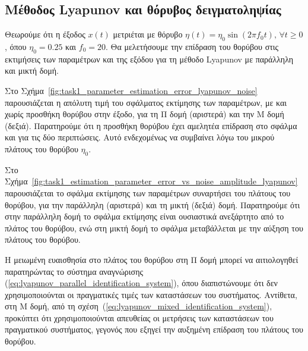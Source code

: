 \documentclass[a4paper,12pt]{article}
\begin{document}
\subsection*{Μέθοδος Lyapunov και θόρυβος δειγματοληψίας}

Θεωρούμε ότι η έξοδος $x(t)$ μετριέται με θόρυβο $\eta(t) = \eta_0 \sin(2\pi f_0 t), \, \forall t \geq 0$, 
όπου $\eta_0 = 0.25$ και $f_0 = 20$. Θα μελετήσουμε την επίδραση του θορύβου στις εκτιμήσεις των παραμέτρων
και της εξόδου για τη μέθοδο Lyapunov με παράλληλη και μικτή
δομή.

Στο Σχήμα~\ref{fig:task1_parameter_estimation_error_lyapunov_noise} παρουσιάζεται η απόλυτη τιμή του 
σφάλματος εκτίμησης των παραμέτρων, με και χωρίς προσθήκη θορύβου στην έξοδο, για τη Π δομή (αριστερά) και την
Μ δομή (δεξιά). Παρατηρούμε ότι η προσθήκη θορύβου έχει αμελητέα επίδραση στο σφάλμα και για τις δύο 
περιπτώσεις. Αυτό ενδεχομένως να συμβαίνει λόγω του μικρού πλάτους του θορύβου $\eta_0$.

Στο Σχήμα~\ref{fig:task1_estimation_parameter_error_vs_noise_amplitude_lyapunov} παρουσιάζεται το σφάλμα 
εκτίμησης των παραμέτρων συναρτήσει του πλάτους του θορύβου, για την παράλληλη (αριστερά) και τη μικτή (δεξιά) 
δομή. Παρατηρούμε ότι στην παράλληλη δομή το σφάλμα εκτίμησης είναι ουσιαστικά ανεξάρτητο από το πλάτος του
θορύβου, ενώ στη μικτή δομή το σφάλμα μεταβάλλεται με την αύξηση του πλάτους του θορύβου. 

Η μειωμένη ευαισθησία στο πλάτος του θορύβου στη Π δομή μπορεί να αιτιολογηθεί παρατηρώντας το σύστημα 
αναγνώρισης (\ref{eq:lyapunov_parallel_identification_system}), όπου διαπιστώνουμε ότι δεν 
χρησιμοποιούνται οι πραγματικές τιμές των καταστάσεων του συστήματος. Αντίθετα, στη Μ δομή, από τη 
σχέση~(\ref{eq:lyapunov_mixed_identification_system}), προκύπτει ότι χρησιμοποιούνται απευθείας οι μετρήσεις 
των καταστάσεων του πραγματικού συστήματος, γεγονός που εξηγεί την αυξημένη επίδραση του πλάτους του θορύβου.
\end{document}
